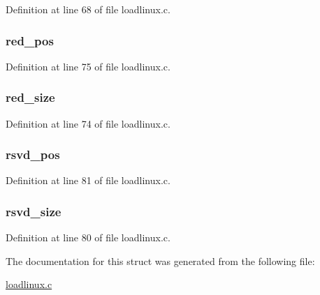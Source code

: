 \-Definition at line 68 of file loadlinux.\-c.

\hypertarget{structatag__videolfb_a7e871d12fa956ff686bf9d2d39788d70}{
\subsubsection[{red\-\_\-pos}]{ {\bf red\-\_\-pos}}}\label{structatag__videolfb_a7e871d12fa956ff686bf9d2d39788d70}


\-Definition at line 75 of file loadlinux.\-c.

\hypertarget{structatag__videolfb_a466eb668b84c08bf28de034321c29241}{
\subsubsection[{red\-\_\-size}]{ {\bf red\-\_\-size}}}\label{structatag__videolfb_a466eb668b84c08bf28de034321c29241}


\-Definition at line 74 of file loadlinux.\-c.

\hypertarget{structatag__videolfb_a631ed037a09490663fbd27eb4224fc47}{
\subsubsection[{rsvd\-\_\-pos}]{ {\bf rsvd\-\_\-pos}}}\label{structatag__videolfb_a631ed037a09490663fbd27eb4224fc47}


\-Definition at line 81 of file loadlinux.\-c.

\hypertarget{structatag__videolfb_a9d840fbd8d826b24ae26dededb556fa0}{
\subsubsection[{rsvd\-\_\-size}]{ {\bf rsvd\-\_\-size}}}\label{structatag__videolfb_a9d840fbd8d826b24ae26dededb556fa0}


\-Definition at line 80 of file loadlinux.\-c.



\-The documentation for this struct was generated from the following file\-:\begin{DoxyCompactItemize}
\item 
\hyperlink{loadlinux_8c}{loadlinux.\-c}\end{DoxyCompactItemize}
